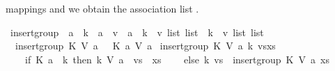 \begin{isabellebody}
\begin{isamarkuptext}
mappings  and  we obtain the association list .%
\end{isamarkuptext}\isamarkuptrue%
\isamarkupfalse%
\ insert{\isacharunderscore}{\kern0pt}group\ {\isacharcolon}{\kern0pt}{\isacharcolon}{\kern0pt}\ {\isachardoublequoteopen}{\isacharparenleft}{\kern0pt}{\isacharprime}{\kern0pt}a\ {\isasymRightarrow}\ {\isacharprime}{\kern0pt}k{\isacharparenright}{\kern0pt}\ {\isasymRightarrow}\ {\isacharparenleft}{\kern0pt}{\isacharprime}{\kern0pt}a\ {\isasymRightarrow}\ {\isacharprime}{\kern0pt}v{\isacharparenright}{\kern0pt}\ {\isasymRightarrow}\ {\isacharprime}{\kern0pt}a\ {\isasymRightarrow}\ {\isacharparenleft}{\kern0pt}{\isacharprime}{\kern0pt}k\ {\isasymtimes}\ {\isacharprime}{\kern0pt}v\ list{\isacharparenright}{\kern0pt}\ list\ {\isasymRightarrow}\ {\isacharparenleft}{\kern0pt}{\isacharprime}{\kern0pt}k\ {\isasymtimes}\ {\isacharprime}{\kern0pt}v\ list{\isacharparenright}{\kern0pt}\ list{\isachardoublequoteclose}\ \isanewline
\ \ {\isachardoublequoteopen}insert{\isacharunderscore}{\kern0pt}group\ K\ V\ a\ {\isacharbrackleft}{\kern0pt}{\isacharbrackright}{\kern0pt}\ {\isacharequal}{\kern0pt}\ {\isacharbrackleft}{\kern0pt}{\isacharparenleft}{\kern0pt}K\ a{\isacharcomma}{\kern0pt}\ {\isacharbrackleft}{\kern0pt}V\ a{\isacharbrackright}{\kern0pt}{\isacharparenright}{\kern0pt}{\isacharbrackright}{\kern0pt}{\isachardoublequoteclose}\isanewline
{\isacharbar}{\kern0pt}\ {\isachardoublequoteopen}insert{\isacharunderscore}{\kern0pt}group\ K\ V\ a\ {\isacharparenleft}{\kern0pt}{\isacharparenleft}{\kern0pt}k{\isacharcomma}{\kern0pt}\ vs{\isacharparenright}{\kern0pt}{\isacharhash}{\kern0pt}xs{\isacharparenright}{\kern0pt}\ {\isacharequal}{\kern0pt}\ {\isacharparenleft}{\kern0pt}\isanewline
\ \ \ \ if\ K\ a\ {\isacharequal}{\kern0pt}\ k\ then\ {\isacharparenleft}{\kern0pt}k{\isacharcomma}{\kern0pt}\ V\ a\ {\isacharhash}{\kern0pt}\ vs{\isacharparenright}{\kern0pt}\ {\isacharhash}{\kern0pt}\ xs\isanewline
\ \ \ \ else\ {\isacharparenleft}{\kern0pt}k{\isacharcomma}{\kern0pt}\ vs{\isacharparenright}{\kern0pt}\ {\isacharhash}{\kern0pt}\ insert{\isacharunderscore}{\kern0pt}group\ K\ V\ a\ xs\ \ \isanewline

\end{isabellebody}

